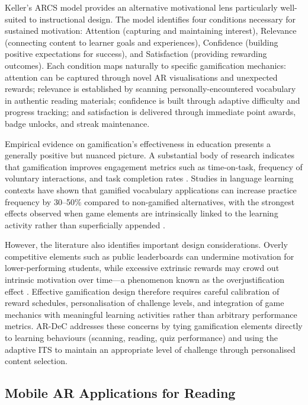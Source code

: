 Keller's ARCS model \cite{keller2010} provides an alternative motivational lens particularly well-suited to instructional design. The model identifies four conditions necessary for sustained motivation: Attention (capturing and maintaining interest), Relevance (connecting content to learner goals and experiences), Confidence (building positive expectations for success), and Satisfaction (providing rewarding outcomes). Each condition maps naturally to specific gamification mechanics: attention can be captured through novel AR visualisations and unexpected rewards; relevance is established by scanning personally-encountered vocabulary in authentic reading materials; confidence is built through adaptive difficulty and progress tracking; and satisfaction is delivered through immediate point awards, badge unlocks, and streak maintenance.

Empirical evidence on gamification's effectiveness in education presents a generally positive but nuanced picture. A substantial body of research indicates that gamification improves engagement metrics such as time-on-task, frequency of voluntary interactions, and task completion rates \cite{bacca2014}. Studies in language learning contexts have shown that gamified vocabulary applications can increase practice frequency by 30--50\% compared to non-gamified alternatives, with the strongest effects observed when game elements are intrinsically linked to the learning activity rather than superficially appended \cite{lan2015}.

However, the literature also identifies important design considerations. Overly competitive elements such as public leaderboards can undermine motivation for lower-performing students, while excessive extrinsic rewards may crowd out intrinsic motivation over time---a phenomenon known as the overjustification effect \cite{ryan2000, csikszentmihalyi1990}. Effective gamification design therefore requires careful calibration of reward schedules, personalisation of challenge levels, and integration of game mechanics with meaningful learning activities rather than arbitrary performance metrics. AR-DeC addresses these concerns by tying gamification elements directly to learning behaviours (scanning, reading, quiz performance) and using the adaptive ITS to maintain an appropriate level of challenge through personalised content selection.

\subsection{Mobile AR Applications for Reading}
\label{subsec:mobile_ar_reading}

